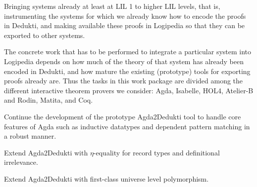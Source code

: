 \begin{workpackage}[id=instrumentation,type=RTD,wphases=1-48,
  short=Integration,%
  title=Integration,
  activity=na,
  lead=Del,
  DelRM=14,
  GotRM=4,
  TumRM=5,
  ChaRM=16,
  CleRM=14,
  ImtRM=1,
  TouRM=11,
  BolRM=16, %
  InrRM=6]

\begin{wpobjectives}
  Bringing systems already at least at
  LIL 1 to higher LIL levels, that is, instrumenting the systems
  for which we already know how to encode the proofs in Dedukti, and
  making available these proofs in Logipedia so that
  they can be exported to other systems.
\end{wpobjectives}

\begin{wpdescription}
  The concrete work that has to be performed to integrate a particular
  system into Logipedia depends on how much of the theory of that
  system has already been encoded in Dedukti, and how mature the
  existing (prototype) tools for exporting proofs already are. Thus
  the tasks in this work package are divided among the different
  interactive theorem provers we consider: Agda, Isabelle, HOL4,
  Atelier-B and Rodin, Matita, and Coq.
\end{wpdescription}

\begin{tasklist}
\begin{task}[id=agda,
  title=Instrument Agda,
  shorttitle=Agda,
  lead=Del,
  DelRM=14,
  GotRM=4,
  wphases=1-18]
% 
\vspace{-5mm}
\begin{compactitem}
\item Continue the development of the prototype Agda2Dedukti tool to
handle core features of Agda such as inductive datatypes and dependent
pattern matching in a robust manner.
\item Extend Agda2Dedukti with $\eta$-equality for record types and definitional irrelevance.
\item Extend Agda2Dedukti with first-class universe level polymorphism.
\end{compactitem}
\end{task}


\end{tasklist}
\end{workpackage}
